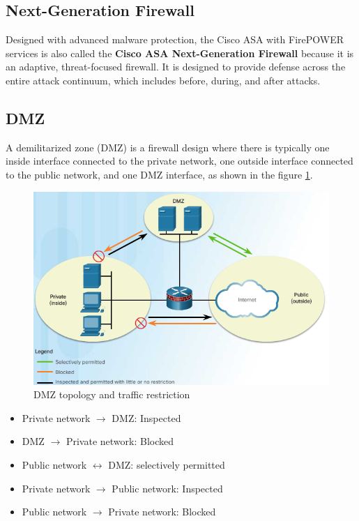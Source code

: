 \subsection{Next-Generation Firewall}

Designed with advanced malware protection, the Cisco ASA with FirePOWER services is also called the \textbf{Cisco ASA Next-Generation Firewall} because it is an adaptive, threat-focused firewall. It is designed to provide defense across the entire attack continuum, which includes before, during, and after attacks.

\subsection{DMZ}

A demilitarized zone (DMZ) is a firewall design where there is typically one inside interface connected to the private network, one outside interface connected to the public network, and one DMZ interface, as shown in the figure \ref{DMZfilter}.

\begin{figure}[hbtp]
\caption{DMZ topology and traffic restriction}\label{DMZfilter}
\centering
\includegraphics[width=10\xm]{pictures/DMZfilter.PNG}
\end{figure}

\begin{itemize}
\item Private network $\rightarrow$ DMZ: Inspected 
\item DMZ  $\rightarrow$ Private network: Blocked
\item Public network  $\leftrightarrow$ DMZ: selectively permitted
\item Private network $\rightarrow$ Public network: Inspected
\item Public network $\rightarrow$ Private network: Blocked
\end{itemize}

